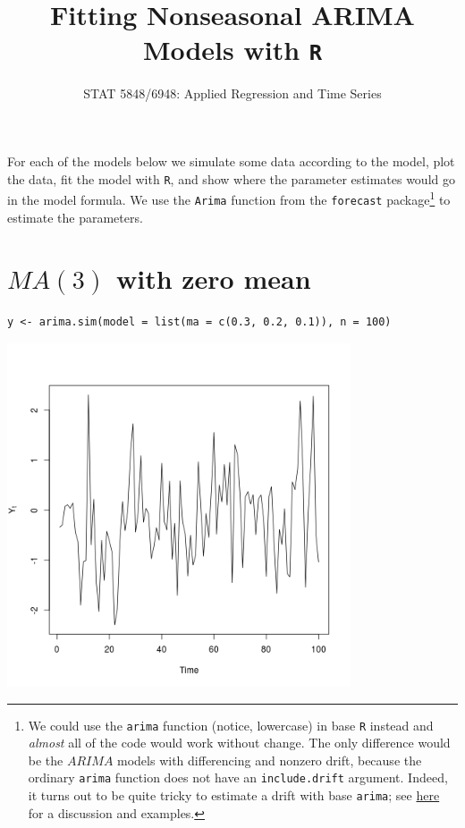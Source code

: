\documentclass[12pt]{article}
\title{Fitting Nonseasonal ARIMA Models with \texttt{R}}
\date{\vspace{-0.5in}STAT 5848/6948: Applied Regression and Time Series}
\begin{document}
\maketitle


For each of the models below we simulate some data according to the model, plot the data, fit the model with \texttt{R}, and show where the parameter estimates would go in the model formula.  We use the \texttt{Arima} function from the \texttt{forecast} package\footnote{We could use the \texttt{arima} function (notice, lowercase) in base \texttt{R} instead and \emph{almost} all of the code would work without change.  The only difference would be the $ARIMA$ models with differencing and nonzero drift, because the ordinary \texttt{arima} function does not have an \texttt{include.drift} argument.  Indeed, it turns out to be quite tricky to estimate a drift with base \texttt{arima}; see \href{http://www.stat.pitt.edu/stoffer/tsa3/Rissues.htm}{here} for a discussion and examples.
 } to estimate the parameters.



\section*{$MA(3)$ with zero mean}
\label{sec-1}


\begin{verbatim}
y <- arima.sim(model = list(ma = c(0.3, 0.2, 0.1)), n = 100)
\end{verbatim}





\includegraphics[width=4.0in]{img/ma3zm.png}
\end{document}
